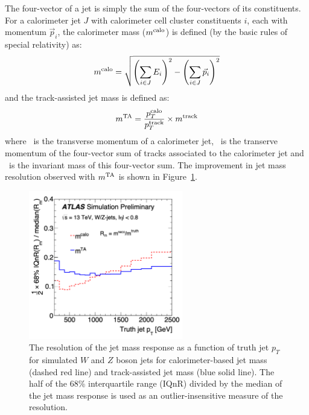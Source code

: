 The four-vector of a jet is simply the sum of the four-vectors of its constituents. For a calorimeter jet $J$ with calorimeter cell cluster constituents $i$, each with momentum $\vec{p}_i$, the calorimeter mass ($m^{\mathrm{calo}}$) is defined (by the basic rules of special relativity) as:
\begin{equation}
    m^{\mathrm{calo}} = \sqrt{
        \left(
            \sum_{i \in J} E_i
        \right)^2
            -
        \left(
            \sum_{i \in J} \vec{p}_i
        \right)^2
    }
    \label{eqn:jet_mass}
\end{equation}
and the track-assisted jet mass is defined as:
\begin{equation}
    m^{\mathrm{TA}} = \frac{p_T^{\mathrm{calo}}}{p_T^{\mathrm{track}}} \times m^{\mathrm{track}}
    \label{eqn:ta_jet_mass}
\end{equation}
where \ptCALO\ is the transverse momentum of a calorimeter jet, \ptTRACK\ is the transerve momentum of the four-vector sum of tracks associated to the calorimeter jet and \mTRACK\ is the invariant mass of this four-vector sum.
The improvement in jet mass resolution observed with $m^{\mathrm{TA}}$ is shown in Figure~\ref{fig:ta_vs_comb_mass_res}.

\begin{figure}
	\centering
	\includegraphics[width=0.6\textwidth]{ta_vs_calo_mass_res_wz_jets}
	\caption{
	The resolution of the jet mass response as a function of truth jet $p_T$ for simulated $W$ and $Z$ boson jets for calorimeter-based jet mass (dashed red line) and track-assisted jet mass (blue solid line).
	The half of the 68\% interquartile range (IQnR) divided by the median of the jet mass response is used as an outlier-insensitive measure of the resolution.
	\cite{ATLAS-CONF-2016-035}
	}
	\label{fig:ta_vs_comb_mass_res}
\end{figure}

